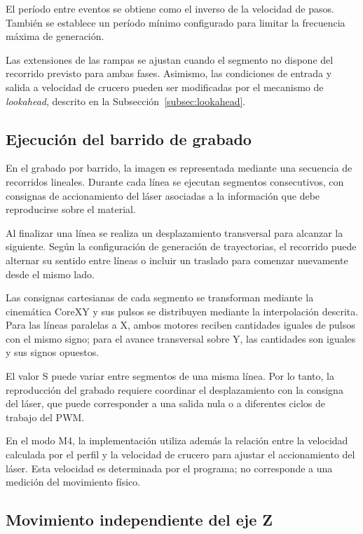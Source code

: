 \documentclass[blue,fullpaper]{ludusofficial}  %
\begin{document}
El período entre eventos se obtiene como
el inverso de la velocidad de pasos. También
se establece un período mínimo configurado
para limitar la frecuencia máxima de generación.

Las extensiones de las rampas se ajustan cuando
el segmento no dispone del recorrido previsto
para ambas fases. Asimismo, las condiciones
de entrada y salida a velocidad de crucero
pueden ser modificadas por el mecanismo
de \textit{lookahead}, descrito en la Subsección~\ref{subsec:lookahead}.

\subsection{Ejecución del barrido de grabado}

En el grabado por barrido, la imagen es representada
mediante una secuencia de recorridos lineales.
Durante cada línea se ejecutan segmentos consecutivos,
con consignas de accionamiento del láser asociadas
a la información que debe reproducirse sobre
el material.

Al finalizar una línea se realiza un desplazamiento
transversal para alcanzar la siguiente.
Según la configuración de generación de trayectorias,
el recorrido puede alternar su sentido entre líneas
o incluir un traslado para comenzar nuevamente
desde el mismo lado.

Las consignas cartesianas de cada segmento se
transforman mediante la cinemática CoreXY y sus
pulsos se distribuyen mediante la interpolación
descrita. Para las líneas paralelas a X,
ambos motores reciben cantidades iguales de pulsos
con el mismo signo; para el avance transversal
sobre Y, las cantidades son iguales y sus
signos opuestos.

El valor S puede variar entre segmentos de una
misma línea. Por lo tanto, la reproducción del
grabado requiere coordinar el desplazamiento
con la consigna del láser, que puede corresponder
a una salida nula o a diferentes ciclos de trabajo
del PWM.

En el modo M4, la implementación utiliza además
la relación entre la velocidad calculada por
el perfil y la velocidad de crucero para ajustar
el accionamiento del láser. Esta velocidad
es determinada por el programa; no corresponde
a una medición del movimiento físico.

\subsection{Movimiento independiente del eje Z}
\end{document}
